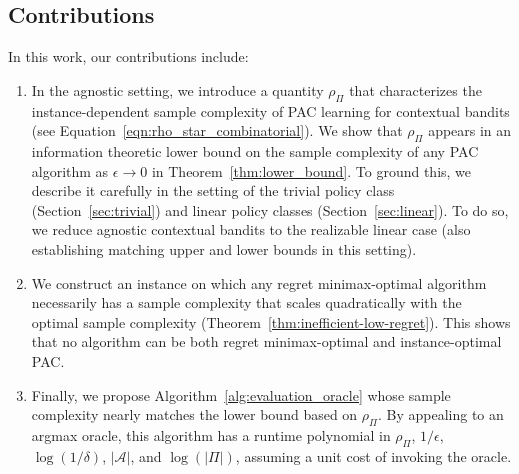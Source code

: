 \documentclass{article}
\newcommand{\mc}[1]{\mathcal{#1}}
\newcommand{\1}{\mathbf{1}}
\renewcommand{\v}{r} %
\begin{document}
\subsection{Contributions}
In this work, our contributions include:
\begin{enumerate}[wide, labelwidth=0pt, labelindent=0pt]
    \item %
    In the agnostic setting, we introduce a quantity $\rho_{\Pi}$ that characterizes the instance-dependent sample complexity of PAC learning for contextual bandits (see Equation~\ref{eqn:rho_star_combinatorial}).
    We show that $\rho_{\Pi}$ appears in an information theoretic lower bound on the sample complexity of any PAC algorithm as $\epsilon \rightarrow 0$ in Theorem~\ref{thm:lower_bound}. To ground this, we describe it carefully in the setting of the trivial policy class (Section~\ref{sec:trivial}) and linear policy classes (Section~\ref{sec:linear}). To do so, we reduce agnostic contextual bandits to the realizable linear case (also establishing matching upper and lower bounds in this setting).
    \item We construct an instance on which any regret minimax-optimal algorithm necessarily has a sample complexity that scales quadratically with the optimal sample complexity (Theorem~\ref{thm:inefficient-low-regret}). This shows that no algorithm can be both regret minimax-optimal and instance-optimal PAC.
    \item Finally, we propose Algorithm~\ref{alg:evaluation_oracle} whose sample complexity nearly matches the lower bound based on $\rho_{\Pi}$. By appealing to an argmax oracle, this algorithm has a runtime polynomial in $\rho_{\Pi}$, $1/\epsilon$, $\log(1/\delta)$, $|\mc{A}|$, and $\log(|\Pi|)$, assuming a unit cost of invoking the oracle. 
  

\end{enumerate}
\end{document}
